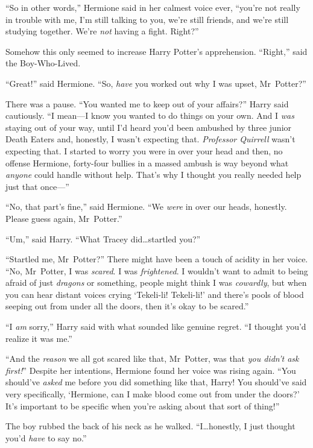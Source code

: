 “So in other words,” Hermione said in her calmest voice ever, “you’re not really in trouble with me, I’m still talking to you, we’re still friends, and we’re still studying together. We’re \emph{not} having a fight. Right?”

Somehow this only seemed to increase Harry Potter’s apprehension. “Right,” said the Boy-Who-Lived.

“Great!” said Hermione. “So, \emph{have} you worked out why I was upset, Mr~Potter?”

There was a pause. “You wanted me to keep out of your affairs?” Harry said cautiously. “I mean—I know you wanted to do things on your own. And I \emph{was} staying out of your way, until I’d heard you’d been ambushed by three junior Death Eaters and, honestly, I wasn’t expecting that. \emph{Professor Quirrell} wasn’t expecting that. I started to worry you were in over your head and then, no offense Hermione, forty-four bullies in a massed ambush is way beyond what \emph{anyone} could handle without help. That’s why I thought you really needed help just that once—”

“No, that part’s fine,” said Hermione. “We \emph{were} in over our heads, honestly. Please guess again, Mr~Potter.”

“Um,” said Harry. “What Tracey did…startled you?”

“Startled me, Mr~Potter?” There might have been a touch of acidity in her voice. “No, Mr~Potter, I was \emph{scared}. I was \emph{frightened}. I wouldn’t want to admit to being afraid of just \emph{dragons} or something, people might think I was \emph{cowardly}, but when you can hear distant voices crying ‘Tekeli-li! Tekeli-li!’ and there’s pools of blood seeping out from under all the doors, then it’s okay to be scared.”

“I \emph{am} sorry,” Harry said with what sounded like genuine regret. “I thought you’d realize it was me.”

“And the \emph{reason} we all got scared like that, Mr~Potter, was that \emph{you didn’t ask first!}” Despite her intentions, Hermione found her voice was rising again. “You should’ve \emph{asked} me before you did something like that, Harry! You should’ve said very specifically, ‘Hermione, can I make blood come out from under the doors?’ It’s important to be specific when you’re asking about that sort of thing!”

The boy rubbed the back of his neck as he walked. “I…honestly, I just thought you’d \emph{have} to say no.”

